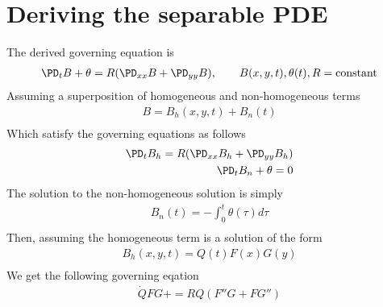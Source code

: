 \documentclass[11pt]{article}
\begin{document}
\MOONSTITLE
\maketitle
\section{Deriving the separable PDE}
The derived governing equation is
\begin{equation}\begin{aligned}
\PD_t B + \theta = R (\PD_{xx} B + \PD_{yy} B), \qquad B(x,y,t),\theta(t),R=\text{constant} \\
\end{aligned} \end{equation}
Assuming a superposition of homogeneous and non-homogeneous terms
\begin{equation}\begin{aligned}
B = B_h(x,y,t) + B_n(t) \\
\end{aligned} \end{equation}
Which satisfy the governing equations as follows
\begin{equation}\begin{aligned}
\PD_t B_h = R (\PD_{xx} B_h + \PD_{yy} B_h) \\
\PD_t B_n + \theta = 0 \\
\end{aligned} \end{equation}
The solution to the non-homogeneous solution is simply
\begin{equation}\begin{aligned}
B_n(t) = - \int_0^t \theta(\tau) d\tau \\
\end{aligned} \end{equation}
Then, assuming the homogeneous term is a solution of the form
\begin{equation}\begin{aligned}
B_h(x,y,t) = Q(t) F(x) G(y) \\
\end{aligned} \end{equation}
We get the following governing eqation
\begin{equation}\begin{aligned}
\dot{Q} FG + = R Q( F'' G +  F G'') \\
\end{aligned} \end{equation}
\end{document}
